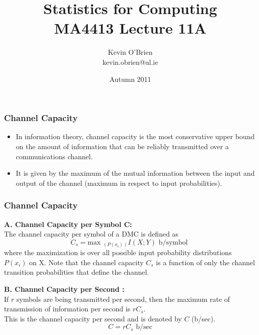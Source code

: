 \documentclass[a4]{beamer}
\title[MA4413]{Statistics for Computing \\ {\normalsize MA4413 Lecture 11A}}
\author[Kevin O'Brien]{Kevin O'Brien \\ {\scriptsize kevin.obrien@ul.ie}}
\date{Autumn 2011}
\institute[Maths \& Stats]{Dept. of Mathematics \& Statistics, \\ University \textit{of} Limerick}
\begin{document}
	
	\begin{frame}
	\frametitle{Channel Capacity}
	\begin{itemize} \item
		In information theory, channel capacity is the most conservative upper bound on the amount of information that can be reliably transmitted over a communications channel. \item  It is given by the maximum of the mutual information between the input and output of the channel (maximum in respect to input probabilities).
	\end{itemize}
	
\end{frame}
\begin{frame}
\frametitle{Channel Capacity}
\textbf{A. Channel Capacity per Symbol C:}\\
The channel capacity per symbol of a DMC is defined as
\[
C_s = \mbox{max }_{(P(x_i))}I(X; Y) \mbox{ b/symbol }
\]
where the maximization is over all possible input probability distributions $P(x_i)$ on X. Note that the
channel capacity $C_s$ is a function of only the channel transition probabilities that define the channel.

\end{frame}

\begin{frame}
\textbf{B. Channel Capacity per Second :}\\
If $r$ symbols are being transmitted per second, then the maximum rate of transmission of
information per second is $rC_s$.\\ This is the channel capacity per second and is denoted by $C$ (b/sec).
\[C = rC_s     \mbox{          b/sec} \]
\end{frame}

\end{document}
